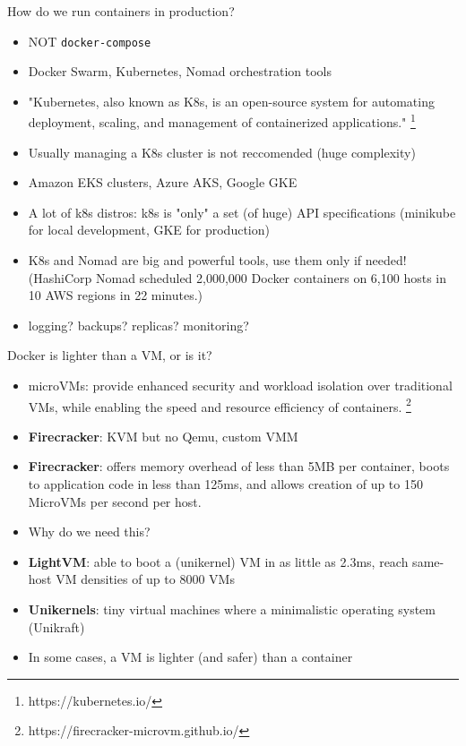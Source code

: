 \documentclass[english]{tumbeamer}
\begin{document}
\begin{frame}{How do we run containers in production?}
\begin{itemize}
    \item NOT \texttt{docker-compose}
    \item Docker Swarm, Kubernetes, Nomad orchestration tools
    \item "Kubernetes, also known as K8s, is an open-source system for automating deployment, scaling, and management of containerized applications." \footnote{https://kubernetes.io/}
    \item Usually managing a K8s cluster is not reccomended (huge complexity)
    \item Amazon EKS clusters, Azure AKS, Google GKE
    \item A lot of k8s distros: k8s is "only" a set (of huge) API specifications (minikube for local development, GKE for production)
    \item K8s and Nomad are big and powerful tools, use them only if needed! (HashiCorp Nomad scheduled 2,000,000 Docker containers on 6,100 hosts in 10 AWS regions in 22 minutes.)
    \item logging? backups? replicas? monitoring?
\end{itemize}
\end{frame}

\begin{frame}{Docker is lighter than a VM, or is it?}
\begin{itemize}
    \item microVMs:  provide enhanced security and workload isolation over traditional VMs, while enabling the speed and resource efficiency of containers. \footnote{https://firecracker-microvm.github.io/}
    \item \textbf{Firecracker}: KVM but no Qemu, custom VMM
    \item \textbf{Firecracker}: offers memory overhead of less than 5MB per container, boots to application code in less than 125ms, and
    allows creation of up to 150 MicroVMs per second per host.
    \item Why do we need this?
    \item \textbf{LightVM}: able to boot a (unikernel) VM in as little as 2.3ms, reach same-host VM densities of up to 8000 VMs
    \item \textbf{Unikernels}: tiny virtual machines where a minimalistic operating system (Unikraft)
    \item In some cases, a VM is lighter (and safer) than a container 
\end{itemize}
\end{frame}
\end{document}
